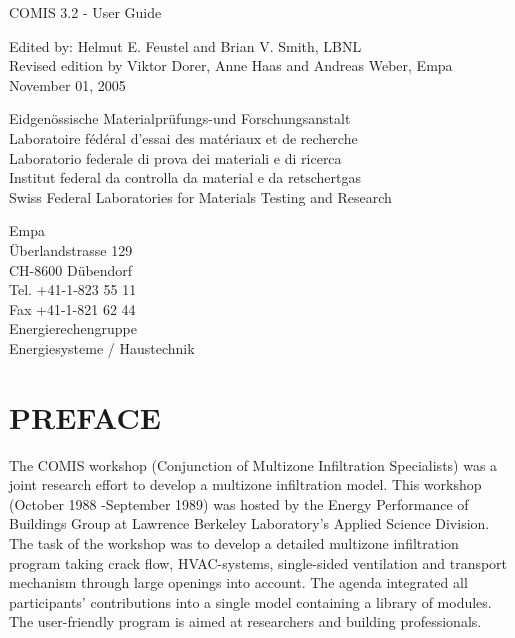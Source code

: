 \documentclass[10pt]{article}
\begin{document}
\begin{titlepage}

COMIS 3.2 - User Guide 

Edited by: Helmut E. Feustel and Brian V. Smith, LBNL\\
Revised edition by Viktor Dorer, Anne Haas and Andreas Weber, Empa November 01, 2005

Eidgen\"ossische Materialpr\"ufungs-und Forschungsanstalt\\
Laboratoire f\'ed\'eral d'essai des mat\'eriaux et de recherche\\
Laboratorio federale di prova dei materiali e di ricerca\\
Institut federal da controlla da material e da retschertgas\\
Swiss Federal Laboratories for Materials Testing and Research

Empa\\
\"Uberlandstrasse 129\\
CH-8600 D\"ubendorf\\
Tel. +41-1-823 55 11\\
Fax +41-1-821 62 44\\

Energierechengruppe\\
Energiesysteme / Haustechnik

\end{titlepage}
\section{PREFACE}
The COMIS workshop (Conjunction of Multizone Infiltration Specialists) was a joint research effort to develop a multizone infiltration model. This workshop (October 1988 -September 1989) was hosted by the Energy Performance of Buildings Group at Lawrence Berkeley Laboratory's Applied Science Division. The task of the workshop was to develop a detailed multizone infiltration program taking crack flow, HVAC-systems, single-sided ventilation and transport mechanism through large openings into account. The agenda integrated all participants' contributions into a single model containing a library of modules. The user-friendly program is aimed at researchers and building professionals. 
\end{document}
